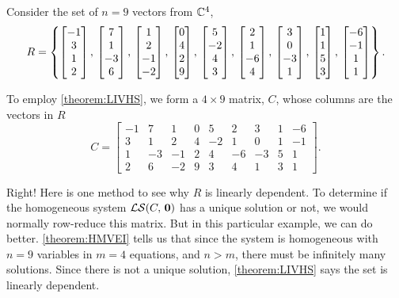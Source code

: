 \documentclass{ximera}
\begin{document}
\begin{example}%
  Consider the set of $n=9$ vectors from $\mathbb{C}^{4}$,
  \[
    R=\left\{
      \begin{bmatrix}-1\\3\\1\\2\end{bmatrix},\,
      \begin{bmatrix}7\\1\\-3\\6\end{bmatrix},\,
      \begin{bmatrix}1\\2\\-1\\-2\end{bmatrix},\,
      \begin{bmatrix}0\\4\\2\\9\end{bmatrix},\,
      \begin{bmatrix}5\\-2\\4\\3\end{bmatrix},\,
      \begin{bmatrix}2\\1\\-6\\4\end{bmatrix},\,
      \begin{bmatrix}3\\0\\-3\\1\end{bmatrix},\,
      \begin{bmatrix}1\\1\\5\\3\end{bmatrix},\,
      \begin{bmatrix}-6\\-1\\1\\1\end{bmatrix}
    \right\}.
  \]

  To employ \ref{theorem:LIVHS}, we form a $4\times 9$ matrix, $C$, whose columns are the vectors in $R$
  \[
    C=
    \begin{bmatrix}
      -1&7&1&0&5&2&3&1&-6\\
      3&1&2&4&-2&1&0&1&-1\\
      1&-3&-1&2&4&-6&-3&5&1\\
      2&6&-2&9&3&4&1&3&1
    \end{bmatrix}.
  \]


  \begin{multipleChoice}
  \end{multipleChoice}

  \begin{feedback}[correct]
    Right!  Here is one method to see why $R$ is linearly dependent.
    To determine if the homogeneous system $\mathcal{LS}\!\left(C,\,\mathbf{0}\right)$ has a
    unique solution or not, we would normally row-reduce this matrix.
    But in this particular example, we can do better.
    \ref{theorem:HMVEI} tells us that since the system is homogeneous
    with $n=9$ variables in $m=4$ equations, and $n>m$, there must be
    infinitely many solutions.  Since there is not a unique solution,
    \ref{theorem:LIVHS} says the set is linearly dependent.
  \end{feedback}
\end{example}
\end{document}
